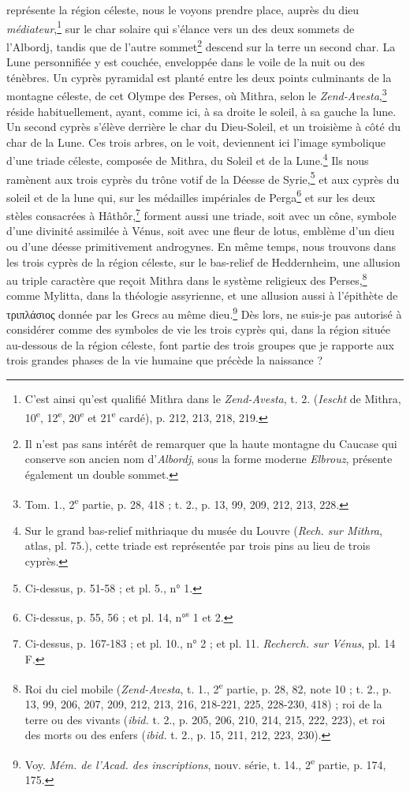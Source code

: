 \documentclass{article}
\begin{document}
représente la région céleste, nous le voyons prendre place, auprès du dieu \emph{médiateur},\footnote{C'est ainsi qu'est qualifié Mithra dans le \emph{Zend-Avesta}, t. 2. (\emph{Iescht} de Mithra, 10\textsuperscript{e}, 12\textsuperscript{e}, 20\textsuperscript{e} et 21\textsuperscript{e} cardé), p. 212, 213, 218, 219.} sur le char solaire qui s'élance vers un des deux sommets de l'Albordj, tandis que de l'autre sommet\footnote{Il n'est pas sans intérêt de remarquer que la haute montagne du Caucase qui conserve son ancien nom d'\emph{Albordj}, sous la forme moderne \emph{Elbrouz}, présente également un double sommet.} descend sur la terre un second char. La Lune personnifiée y est couchée, enveloppée dans le voile de la nuit ou des ténèbres. Un cyprès pyramidal est planté entre les deux points culminants de la montagne céleste, de cet Olympe des Perses, où Mithra, selon le \emph{Zend-Avesta},\footnote{Tom. 1., 2\textsuperscript{e} partie, p. 28, 418 ; t. 2., p. 13, 99, 209, 212, 213, 228.} réside habituellement, ayant, comme ici, à sa droite le soleil, à sa gauche la lune. Un second cyprès s'élève derrière le char du Dieu-Soleil, et un troisième à côté du char de la Lune. Ces trois arbres, on le voit, deviennent ici l'image symbolique d'une triade céleste, composée de Mithra, du Soleil et de la Lune.\footnote{Sur le grand bas-relief mithriaque du musée du Louvre (\emph{Rech. sur Mithra}, atlas, pl. 75.), cette triade est représentée par trois pins au lieu de trois cyprès.} Ils nous ramènent aux trois cyprès du trône votif de la Déesse de Syrie,\footnote{Ci-dessus, p. 51-58 ; et pl. 5., n° 1.} et aux cyprès du soleil et de la lune qui, sur les médailles impériales de Perga\footnote{Ci-dessus, p. 55, 56 ; et pl. 14, n°\textsuperscript{s} 1 et 2.} et sur les deux stèles consacrées à Hâthôr,\footnote{Ci-dessus, p. 167-183 ; et pl. 10., n° 2 ; et pl. 11. \emph{Recherch. sur Vénus}, pl. 14 F.} forment aussi une triade, soit avec un cône, symbole d'une divinité assimilée à Vénus, soit avec une fleur de lotus, emblème d'un dieu ou d'une déesse primitivement androgynes. En même temps, nous trouvons dans les trois cyprès de la région céleste, sur le bas-relief de Heddernheim, une allusion au triple caractère que reçoit Mithra dans le système religieux des Perses,\footnote{Roi du ciel mobile (\emph{Zend-Avesta}, t. 1., 2\textsuperscript{e} partie, p. 28, 82, note 10 ; t. 2., p. 13, 99, 206, 207, 209, 212, 213, 216, 218-221, 225, 228-230, 418) ; roi de la terre ou des vivants (\emph{ibid.} t. 2., p. 205, 206, 210, 214, 215, 222, 223), et roi des morts ou des enfers (\emph{ibid.} t. 2., p. 15, 211, 212, 223, 230).} comme Mylitta, dans la théologie assyrienne, et une allusion aussi à l'épithète de \textgreek{τριπλάσιος} donnée par les Grecs au même dieu.\footnote{Voy. \emph{Mém. de l'Acad. des inscriptions}, nouv. série, t. 14., 2\textsuperscript{e} partie, p. 174, 175.} Dès lors, ne suis-je pas autorisé à considérer comme des symboles de vie les trois cyprès qui, dans la région située au-dessous de la région céleste, font partie des trois groupes que je rapporte aux trois grandes phases de la vie humaine que précède la naissance ?
\end{document}
